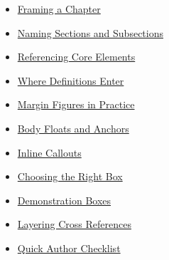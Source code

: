 
\begin{itemize}[leftmargin=1.5em,label={},itemsep=0.15em,topsep=0.3em]
  \item \hyperref[sec:chapter-frame]{Framing a Chapter}
  \item \hyperref[sec:section-heads]{Naming Sections and Subsections}
  \item \hyperref[sec:core-references]{Referencing Core Elements}
  \item \hyperref[sec:definition-demo]{Where Definitions Enter}
\end{itemize}

\begin{itemize}[leftmargin=1.5em,label={},itemsep=0.15em,topsep=0.3em]
  \item \hyperref[sec:margin-figures]{Margin Figures in Practice}
  \item \hyperref[sec:body-floats]{Body Floats and Anchors}
  \item \hyperref[sec:inline-callouts]{Inline Callouts}
\end{itemize}

\begin{itemize}[leftmargin=1.5em,label={},itemsep=0.15em,topsep=0.3em]
  \item \hyperref[sec:choose-box]{Choosing the Right Box}
  \item \hyperref[sec:demo-boxes]{Demonstration Boxes}
  \item \hyperref[sec:layering-crossrefs]{Layering Cross References}
  \item \hyperref[sec:author-checklist]{Quick Author Checklist}
\end{itemize}

\setcounter{chapter}{0}
